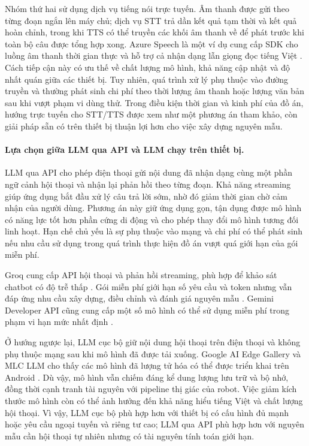 Nhóm thứ hai sử dụng dịch vụ tiếng nói trực tuyến. Âm thanh được gửi theo từng đoạn ngắn lên máy chủ; dịch vụ STT trả dần kết quả tạm thời và kết quả hoàn chỉnh, trong khi TTS có thể truyền các khối âm thanh về để phát trước khi toàn bộ câu được tổng hợp xong. Azure Speech là một ví dụ cung cấp SDK cho luồng âm thanh thời gian thực và hỗ trợ cả nhận dạng lẫn giọng đọc tiếng Việt . Cách tiếp cận này có ưu thế về chất lượng mô hình, khả năng cập nhật và độ nhất quán giữa các thiết bị. Tuy nhiên, quá trình xử lý phụ thuộc vào đường truyền và thường phát sinh chi phí theo thời lượng âm thanh hoặc lượng văn bản sau khi vượt phạm vi dùng thử. Trong điều kiện thời gian và kinh phí của đồ án, hướng trực tuyến cho STT/TTS được xem như một phương án tham khảo, còn giải pháp sẵn có trên thiết bị thuận lợi hơn cho việc xây dựng nguyên mẫu.

\paragraph{Lựa chọn giữa LLM qua API và LLM chạy trên thiết bị.}
LLM qua API cho phép điện thoại gửi nội dung đã nhận dạng cùng một phần ngữ cảnh hội thoại và nhận lại phản hồi theo từng đoạn. Khả năng streaming giúp ứng dụng bắt đầu xử lý câu trả lời sớm, nhờ đó giảm thời gian chờ cảm nhận của người dùng. Phương án này giữ ứng dụng gọn, tận dụng được mô hình có năng lực tốt hơn phần cứng di động và cho phép thay đổi mô hình tương đối linh hoạt. Hạn chế chủ yếu là sự phụ thuộc vào mạng và chi phí có thể phát sinh nếu nhu cầu sử dụng trong quá trình thực hiện đồ án vượt quá giới hạn của gói miễn phí.

Groq cung cấp API hội thoại và phản hồi streaming, phù hợp để khảo sát chatbot có độ trễ thấp . Gói miễn phí giới hạn số yêu cầu và token nhưng vẫn đáp ứng nhu cầu xây dựng, điều chỉnh và đánh giá nguyên mẫu . Gemini Developer API cũng cung cấp một số mô hình có thể sử dụng miễn phí trong phạm vi hạn mức nhất định .

Ở hướng ngược lại, LLM cục bộ giữ nội dung hội thoại trên điện thoại và không phụ thuộc mạng sau khi mô hình đã được tải xuống. Google AI Edge Gallery và MLC LLM cho thấy các mô hình đã lượng tử hóa có thể được triển khai trên Android . Dù vậy, mô hình vẫn chiếm đáng kể dung lượng lưu trữ và bộ nhớ, đồng thời cạnh tranh tài nguyên với pipeline thị giác của robot. Việc giảm kích thước mô hình còn có thể ảnh hưởng đến khả năng hiểu tiếng Việt và chất lượng hội thoại. Vì vậy, LLM cục bộ phù hợp hơn với thiết bị có cấu hình đủ mạnh hoặc yêu cầu ngoại tuyến và riêng tư cao; LLM qua API phù hợp hơn với nguyên mẫu cần hội thoại tự nhiên nhưng có tài nguyên tính toán giới hạn.

